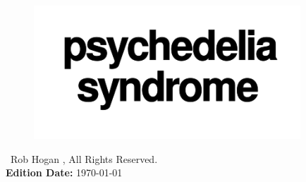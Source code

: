 
\thispagestyle{empty}%
\vspace*{\fill}
\begin{figure}[H]
    \centering
      \includegraphics[width=10cm]{src/cover/title_page.png}%
\end{figure}
\vspace*{\fill}

\clearpage

\vspace*{\fill}
\textcopyright\ Rob Hogan \the\year{}, All Rights Reserved. \\
\textbf{Edition Date:} \today

\doclicenseThis
\clearpage
